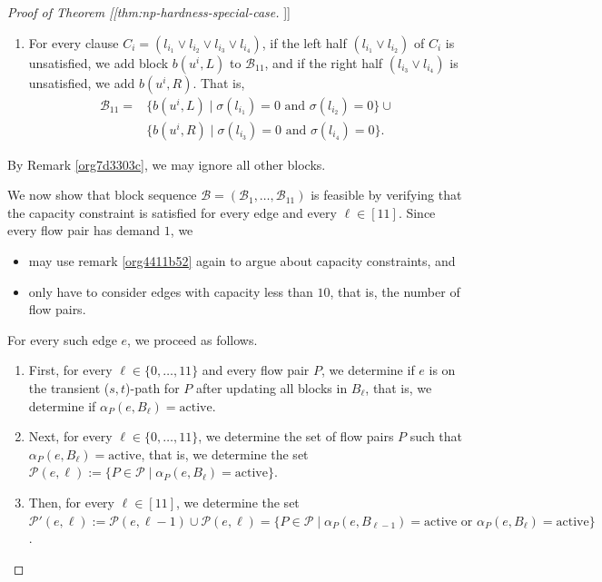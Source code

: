 \documentclass[fontsize=11pt,paper=a4]{book}
\begin{document}
\begin{proof}[Proof of Theorem [[thm:np-hardness-special-case]]]
\begin{enumerate}
\item For every clause \(C_i=(l_{i_1}\vee l_{i_2}\vee l_{i_3}\vee l_{i_4})\), if the left half \((l_{i_1}\vee l_{i_2})\) of \(C_i\) is unsatisfied, we add block \(b(u^i,L)\) to \(\mathscr{B}_{11}\), and if the right half \((l_{i_3}\vee l_{i_4})\) is unsatisfied, we add \(b(u^i,R)\).
That is,
\begin{align*}
\mathscr{B}_{11}=&\{b(u^i,L)\mid\sigma(l_{i_1})=0\text{ and }\sigma(l_{i_2})=0\}\cup\\
&\{b(u^i,R)\mid\sigma(l_{i_3})=0\text{ and }\sigma(l_{i_4})=0\}.
\end{align*}
\end{enumerate}

By Remark \ref{org7d3303c}, we may ignore all other blocks.

We now show that block sequence \(\mathcal{B}=(\mathscr{B}_1,\dots,\mathscr{B}_{11})\) is feasible by verifying that the capacity constraint is satisfied for every edge and every \(\ell\in[11]\).
Since every flow pair has demand \(1\), we

\begin{itemize}
\item may use remark \ref{org4411b52} again to argue about capacity constraints, and

\item only have to consider edges with capacity less than \(10\), that is, the number of flow pairs.
\end{itemize}


For every such edge \(e\), we proceed as follows.

\begin{enumerate}
\item First, for every \(\ell\in\{0,\dots,11\}\) and every flow pair \(P\), we determine if \(e\) is on the transient (\(s,t\))-path for \(P\) after updating all blocks in \(B_{\ell}\), that is, we determine if \(\alpha_P(e,B_{\ell})=\mathrm{active}\).

\item Next, for every \(\ell\in\{0,\dots,11\}\), we determine the set of flow pairs \(P\) such that \(\alpha_P(e,B_{\ell})=\mathrm{active}\), that is, we determine the set \(\mathcal{P}(e,\ell):=\{P\in\mathcal{P}\mid\alpha_P(e,B_{\ell})=\mathrm{active}\}\).

\item Then, for every \(\ell\in[11]\), we determine the set \(\mathcal{P}'(e,\ell):=\mathcal{P}(e,\ell-1)\cup\mathcal{P}(e,\ell)=\{P\in\mathcal{P}\mid\alpha_P(e,B_{\ell-1})=\mathrm{active}\text{ or }\alpha_P(e,B_{\ell})=\mathrm{active}\}\).


\end{enumerate}
\end{proof}
\end{document}
